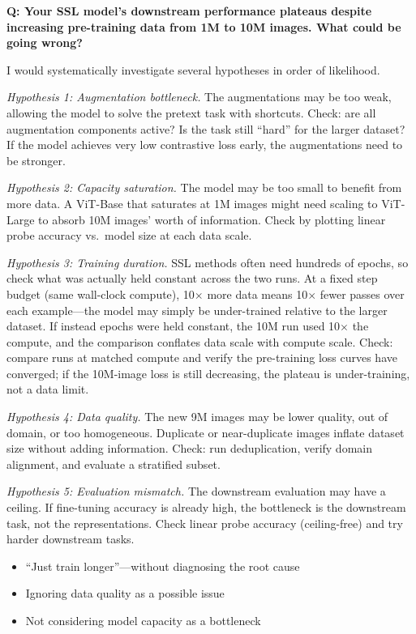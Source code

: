 \begin{interviewq}
\textbf{Q: Your SSL model's downstream performance plateaus despite increasing pre-training data from 1M to 10M images. What could be going wrong?}

 \quad {} \quad \badgefreq{\freqmed}

\stronganswer I would systematically investigate several hypotheses in order of likelihood.

\textit{Hypothesis 1: Augmentation bottleneck.} The augmentations may be too weak, allowing the model to solve the pretext task with shortcuts. Check: are all augmentation components active? Is the task still ``hard'' for the larger dataset? If the model achieves very low contrastive loss early, the augmentations need to be stronger.

\textit{Hypothesis 2: Capacity saturation.} The model may be too small to benefit from more data. A ViT-Base that saturates at 1M images might need scaling to ViT-Large to absorb 10M images' worth of information. Check by plotting linear probe accuracy vs.\ model size at each data scale.

\textit{Hypothesis 3: Training duration.} SSL methods often need hundreds of epochs, so check what was actually held constant across the two runs. At a fixed step budget (same wall-clock compute), 10$\times$ more data means 10$\times$ fewer passes over each example---the model may simply be under-trained relative to the larger dataset. If instead epochs were held constant, the 10M run used 10$\times$ the compute, and the comparison conflates data scale with compute scale. Check: compare runs at matched compute and verify the pre-training loss curves have converged; if the 10M-image loss is still decreasing, the plateau is under-training, not a data limit.

\textit{Hypothesis 4: Data quality.} The new 9M images may be lower quality, out of domain, or too homogeneous. Duplicate or near-duplicate images inflate dataset size without adding information. Check: run deduplication, verify domain alignment, and evaluate a stratified subset.

\textit{Hypothesis 5: Evaluation mismatch.} The downstream evaluation may have a ceiling. If fine-tuning accuracy is already high, the bottleneck is the downstream task, not the representations. Check linear probe accuracy (ceiling-free) and try harder downstream tasks.

\redflags
\begin{itemize}
    \item ``Just train longer''---without diagnosing the root cause
    \item Ignoring data quality as a possible issue
    \item Not considering model capacity as a bottleneck
\end{itemize}


\end{interviewq}
